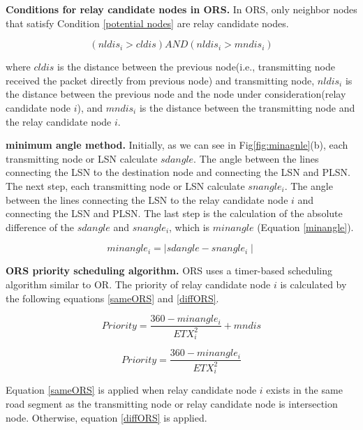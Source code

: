 \documentclass{comex}
\begin{document}
\textbf{Conditions for relay candidate nodes in ORS.} 
In ORS, only neighbor nodes that satisfy Condition \ref{potential nodes} are relay candidate nodes.

\begin{equation}
\label{potential nodes}
\left( nldis_i > cldis \right)   AND   \left( nldis_i > mndis_i \right) 
\end{equation}

where $cldis$ is the distance between the previous node(i.e., transmitting node received the packet directly from previous node) and transmitting node,
$nldis_i$ is the distance between the previous node and the node under consideration(relay candidate node $i$), and $mndis_i$ is the distance between the transmitting node and the relay candidate node $i$.


\textbf{minimum angle method.} Initially, as we can see in Fig\ref{fig:minagnle}(b), each transmitting node or LSN calculate $sdangle$. The angle between the lines connecting the LSN to the destination node and connecting the LSN and PLSN. The next step, each transmitting node or LSN calculate $snangle_i$. The angle between the lines connecting the LSN to the relay candidate node $i$  and connecting the LSN and PLSN. The last step is the calculation of the absolute difference of the $sdangle$ and $snangle_i$, which is $minangle$ (Equation \ref{minangle}).

\begin{equation}
\label{minangle}
minangle_i = \mid sdangle - snangle_i \mid
\end{equation}


\textbf{ORS priority scheduling algorithm.} 
ORS uses a timer-based scheduling algorithm similar to OR. The priority of relay candidate node $i$ is calculated by the following equations \ref{sameORS} and \ref{diffORS}.


\begin{equation}
\label{sameORS}
Priority = \frac{360 - minangle_i}{ETX_{i}^{2}} + mndis
\end{equation}

\begin{equation}
\label{diffORS}
Priority = \frac{360 - minangle_i}{ETX_{i}^{2}} 
\end{equation}

Equation \ref{sameORS}  is applied when relay candidate node $i$ exists in the same road segment as the transmitting node or relay candidate node is intersection node. Otherwise, equation \ref{diffORS} is applied.
\end{document}
